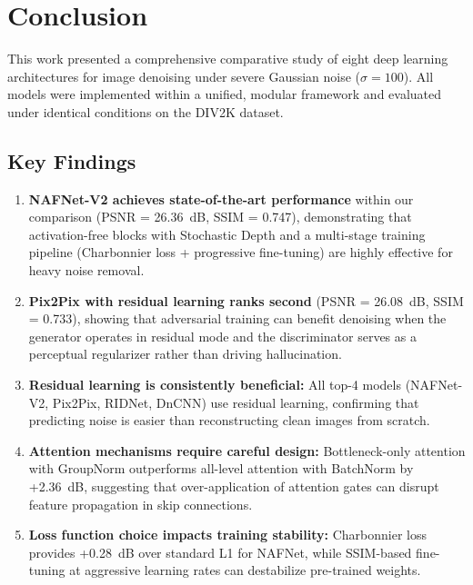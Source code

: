 \section{Conclusion}
\label{sec:conclusion}

This work presented a comprehensive comparative study of eight deep learning architectures for image denoising under severe Gaussian noise ($\sigma = 100$). All models were implemented within a unified, modular framework and evaluated under identical conditions on the DIV2K dataset.

\subsection{Key Findings}

\begin{enumerate}
    \item \textbf{NAFNet-V2 achieves state-of-the-art performance} within our comparison (PSNR = 26.36~dB, SSIM = 0.747), demonstrating that activation-free blocks with Stochastic Depth and a multi-stage training pipeline (Charbonnier loss + progressive fine-tuning) are highly effective for heavy noise removal.
    
    \item \textbf{Pix2Pix with residual learning ranks second} (PSNR = 26.08~dB, SSIM = 0.733), showing that adversarial training can benefit denoising when the generator operates in residual mode and the discriminator serves as a perceptual regularizer rather than driving hallucination.
    
    \item \textbf{Residual learning is consistently beneficial:} All top-4 models (NAFNet-V2, Pix2Pix, RIDNet, DnCNN) use residual learning, confirming that predicting noise is easier than reconstructing clean images from scratch.
    
    \item \textbf{Attention mechanisms require careful design:} Bottleneck-only attention with GroupNorm outperforms all-level attention with BatchNorm by +2.36~dB, suggesting that over-application of attention gates can disrupt feature propagation in skip connections.
    
    \item \textbf{Loss function choice impacts training stability:} Charbonnier loss provides +0.28~dB over standard L1 for NAFNet, while SSIM-based fine-tuning at aggressive learning rates can destabilize pre-trained weights.
    

\end{enumerate}
